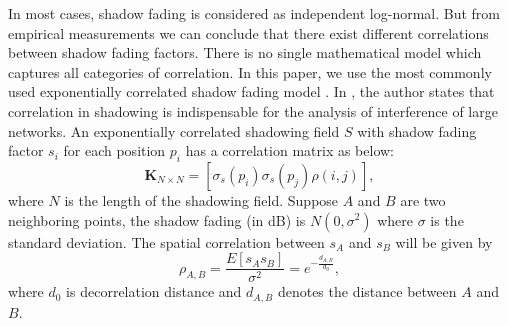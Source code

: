 \documentclass[journal,10pt]{IEEEtran}
\begin{document}
In most cases, shadow fading is considered as independent log-normal. But from empirical measurements we can conclude that there exist different correlations between shadow fading factors. There is no single mathematical model which captures all categories of correlation\cite{szyszkowicz2010feasibility}. In this paper, we use the most commonly used exponentially correlated shadow fading model \cite{szyszkowicz2011interference}. In \cite{szyszkowicz2011interference}, the author states that correlation in shadowing is indispensable for the analysis of interference of large networks. An exponentially correlated shadowing field $S$ with shadow fading factor $s_{i}$ for each position $p_{i}$ has a correlation matrix as below:
\begin{equation}
\mathbf{K}_{N\times N} = [ \sigma_{s}(p_{i})\sigma_{s}(p_{j})\rho(i,j)],
\label{correlationmatrix}
\end{equation}
where $N$ is the length of the shadowing field. Suppose $A$ and $B$ are two neighboring points, the shadow fading (in dB) is $N(0,\sigma^2)$ where $\sigma$ is the standard deviation. The spatial correlation between $s_{A}$ and $s_{B}$ will be given by 
\begin{equation}
\rho_{A,B} = \frac{E[s_{A}s_{B}]}{\sigma^2} =e^{-\frac{d_{A,B}}{d_{0}}},
\end{equation}
where $d_{0}$ is decorrelation distance and  $d_{A, B}$ denotes the distance between $A$ and $B$.
%


 
 
\end{document}
